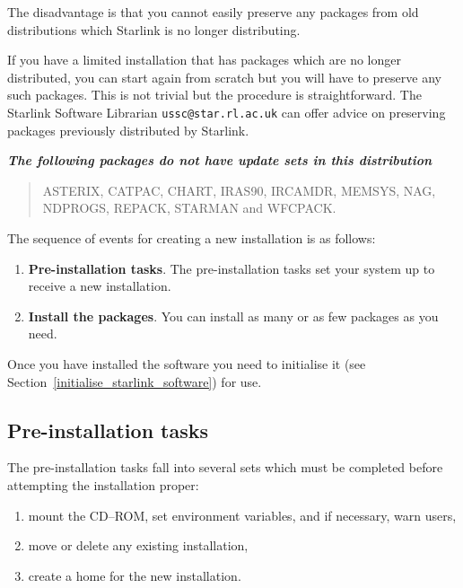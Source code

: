 \documentclass[twoside,11pt]{article}
\newcommand{\htmlref}[2]{#1}
\newcommand{\latex}[1]{#1}
\newcommand{\xlabel}[1]{}
\renewcommand{\_}{\texttt{\symbol{95}}}
\newcommand{\cdrom}{CD--ROM}
\newcommand{\cdrom}{CD-ROM}
\begin{document}
The disadvantage is that you cannot easily preserve any packages from old
distributions which Starlink is no longer distributing.

If you have a limited installation that has packages which are
no longer distributed, you can start again from scratch but you will
have to preserve any such packages.  This is not trivial but the
procedure is straightforward.
The Starlink Software Librarian \texttt{ussc@star.rl.ac.uk} can offer
advice on preserving packages previously distributed by Starlink.

\textit{\textbf{The following packages do not have update sets in this
distribution}}

\begin{quote}
ASTERIX, CATPAC, CHART, IRAS90, IRCAMDR, MEMSYS,
NAG, NDPROGS, REPACK, STARMAN and WFCPACK.
\end{quote}

The sequence of events for creating a new installation is as follows:

\begin{enumerate}

\item \textbf{Pre-installation tasks}.  The pre-installation tasks set your
system up to receive a new installation.

\item \textbf{Install the packages}.  You can install as many or as few
packages as you need.

\end{enumerate}

Once you have installed the software you need to
\htmlref{initialise}{initialise_starlink_software} it \latex{(see
Section~\ref{initialise_starlink_software})} for use.

\subsection{\xlabel{pre-installation_tasks}Pre-installation tasks}
\label{pre-installation_tasks}

The pre-installation tasks fall into several sets which must be completed
before attempting the installation proper:

\begin{enumerate}

\item mount the \cdrom, set environment variables, and if necessary,
warn users,

\item move or delete any existing installation,

\item create a home for the new installation.
\end{enumerate}
\end{document}
